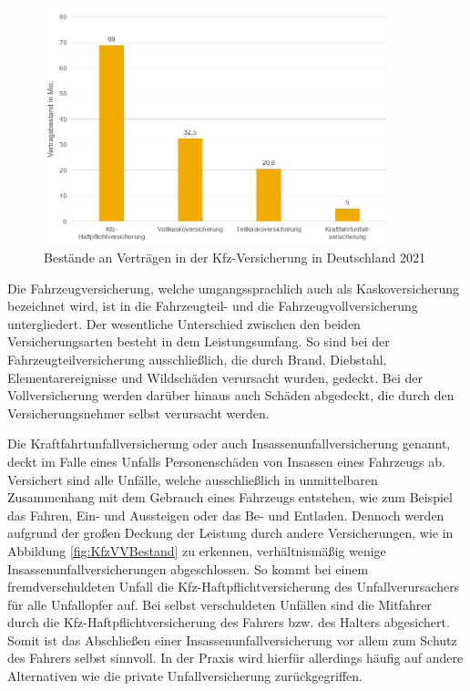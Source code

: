 \begin{figure}[h]
    \centering
    \includegraphics[width=0.9\textwidth]{img/KfzV_Bestände_an_Verträgen_2021.jpg}
    \caption[Bestände an Verträgen in der Kfz-Versicherung in Deutschland 2021]{Bestände an Verträgen in der Kfz-Versicherung in Deutschland 2021\autocite{KfzVVBestand}}
    \label{fig:KfzVVBestand}
\end{figure}


Die Fahrzeugversicherung, welche umgangssprachlich auch als Kaskoversicherung bezeichnet wird, ist in die Fahrzeugteil- und die Fahrzeugvollversicherung untergliedert. Der wesentliche Unterschied zwischen den beiden Versicherungsarten besteht in dem Leistungsumfang. So sind bei der Fahrzeugteilversicherung ausschließlich, die durch Brand, Diebstahl, Elementarereignisse und Wildschäden verursacht wurden, gedeckt. Bei der Vollversicherung werden darüber hinaus auch Schäden abgedeckt, die durch den Versicherungsnehmer selbst verursacht werden.\autocite[Vgl.][S. 48]{FELTEN2012}

Die Kraftfahrtunfallversicherung oder auch Insassenunfallversicherung genannt, deckt im Falle eines Unfalls Personenschäden von Insassen eines Fahrzeugs ab. Versichert sind alle Unfälle, welche ausschließlich in unmittelbaren Zusammenhang mit dem Gebrauch eines Fahrzeugs entstehen, wie zum Beispiel das Fahren, Ein- und Aussteigen oder das Be- und Entladen.\autocite[Vgl.][S. 6f]{STADLER1998} Dennoch werden aufgrund der großen Deckung der Leistung durch andere Versicherungen, wie in Abbildung \vref{fig:KfzVVBestand} zu erkennen, verhältnismäßig wenige Insassenunfallversicherungen abgeschlossen. So kommt bei einem fremdverschuldeten Unfall die Kfz-Haftpflichtversicherung des Unfallverursachers für alle Unfallopfer auf. Bei selbst verschuldeten Unfällen sind die Mitfahrer durch die Kfz-Haftpflichtversicherung des Fahrers bzw. des Halters abgesichert. Somit ist das Abschließen einer Insassenunfallversicherung vor allem zum Schutz des Fahrers selbst sinnvoll.\autocite[Vgl.][S. 173f]{LAMMERS2006} In der Praxis wird hierfür allerdings häufig auf andere Alternativen wie die private Unfallversicherung zurückgegriffen.\autocite[Vgl.][]{GRATZLA2018}  

